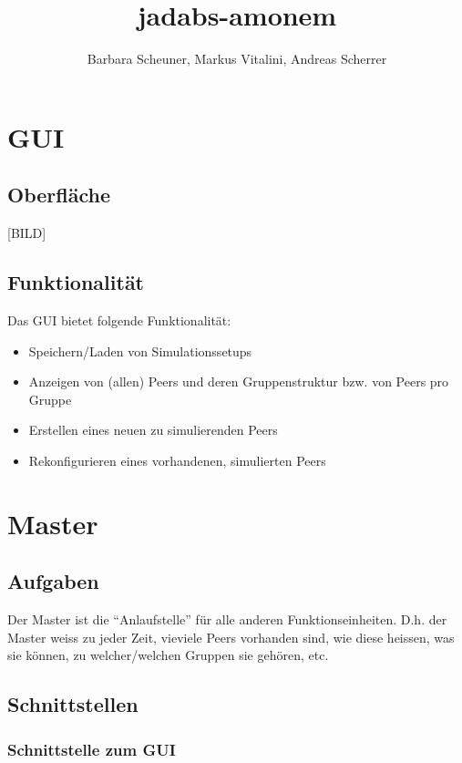\documentclass[10pt]{article}
\author{Barbara Scheuner, Markus Vitalini, Andreas Scherrer}
\title{jadabs-amonem}
\begin{document}
\maketitle
\tableofcontents

\section{GUI}
\subsection{Oberfl\"ache}
[BILD]

\subsection{Funktionalit\"at}
Das GUI bietet folgende Funktionalit\"at:
\begin{itemize}
	\item Speichern/Laden von Simulationssetups
	\item Anzeigen von (allen) Peers und deren Gruppenstruktur bzw. von Peers pro Gruppe
	\item Erstellen eines neuen zu simulierenden Peers
	\item Rekonfigurieren eines vorhandenen, simulierten Peers
\end{itemize}

\section{Master}
\subsection{Aufgaben}
Der Master ist die ``Anlaufstelle'' f\"ur alle anderen Funktionseinheiten. D.h. der Master weiss
zu jeder Zeit, vieviele Peers vorhanden sind, wie diese heissen, was sie k\"onnen, zu welcher/welchen
Gruppen sie geh\"oren, etc.
\subsection{Schnittstellen}
\subsubsection{Schnittstelle zum GUI}
\end{document}
